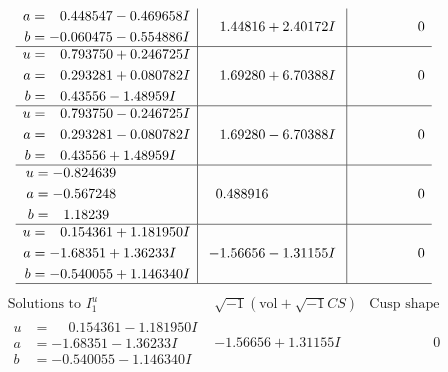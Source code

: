 \documentclass[1p]{elsarticle_modified}
\theoremstyle{definition}
\newcommand{\I}{\sqrt{-1}}
\begin{document}
$$\begin{array}{c|c|c}
\begin{aligned}
a &= \phantom{-}0.448547 - 0.469658 I \\
b &= -0.060475 - 0.554886 I\end{aligned}
 & \phantom{-}1.44816 + 2.40172 I & \phantom{-0.000000 } 0 \\ \hline\begin{aligned}
u &= \phantom{-}0.793750 + 0.246725 I \\
a &= \phantom{-}0.293281 + 0.080782 I \\
b &= \phantom{-}0.43556 - 1.48959 I\end{aligned}
 & \phantom{-}1.69280 + 6.70388 I & \phantom{-0.000000 } 0 \\ \hline\begin{aligned}
u &= \phantom{-}0.793750 - 0.246725 I \\
a &= \phantom{-}0.293281 - 0.080782 I \\
b &= \phantom{-}0.43556 + 1.48959 I\end{aligned}
 & \phantom{-}1.69280 - 6.70388 I & \phantom{-0.000000 } 0 \\ \hline\begin{aligned}
u &= -0.824639\phantom{ +0.000000I} \\
a &= -0.567248\phantom{ +0.000000I} \\
b &= \phantom{-}1.18239\phantom{ +0.000000I}\end{aligned}
 & \phantom{-}0.488916\phantom{ +0.000000I} & \phantom{-0.000000 } 0 \\ \hline\begin{aligned}
u &= \phantom{-}0.154361 + 1.181950 I \\
a &= -1.68351 + 1.36233 I \\
b &= -0.540055 + 1.146340 I\end{aligned}
 & -1.56656 - 1.31155 I & \phantom{-0.000000 } 0\\
 \hline 
 \end{array}$$\newpage$$\begin{array}{c|c|c}  
\text{Solutions to }I^u_{1}& \I (\text{vol} + \sqrt{-1}CS) & \text{Cusp shape}\\
 \hline 
\begin{aligned}
u &= \phantom{-}0.154361 - 1.181950 I \\
a &= -1.68351 - 1.36233 I \\
b &= -0.540055 - 1.146340 I\end{aligned}
 & -1.56656 + 1.31155 I & \phantom{-0.000000 } 0 \\ \hline\begin{aligned}

\end{aligned}
\end{array}$$
\end{document}
